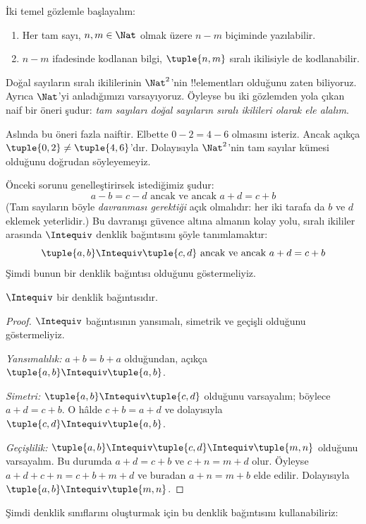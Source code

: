 \documentclass[../../../include/open-logic-section]{subfiles}
\begin{document}

İki temel gözlemle başlayalım:
	\begin{enumerate}
		\item Her tam sayı, $n, m \in\Nat$ olmak üzere $n - m$ biçiminde yazılabilir.
		\item $n - m$ ifadesinde kodlanan bilgi, $\tuple{n, m}$ sıralı ikilisiyle de kodlanabilir.
	\end{enumerate}
Doğal sayıların sıralı ikililerinin $\Nat^2$'nin !!{element}ları olduğunu
zaten biliyoruz. Ayrıca $\Nat$'yi anladığımızı varsayıyoruz. Öyleyse bu iki
gözlemden yola çıkan naif bir öneri şudur: \emph{tam sayıları doğal sayıların
sıralı ikilileri olarak ele alalım}.

Aslında bu öneri fazla naiftir. Elbette $0- 2 = 4 - 6$ olmasını isteriz.
Ancak açıkça $\tuple{0, 2 }\neq \tuple{4, 6}$'dır. Dolayısıyla $\Nat^2$'nin
tam sayılar kümesi olduğunu doğrudan söyleyemeyiz.

Önceki sorunu genelleştirirsek istediğimiz şudur:
	$$a - b = c - d \text{ ancak ve ancak }a + d = c + b$$
(Tam sayıların böyle \emph{davranması gerektiği} açık olmalıdır: her iki
tarafa da $b$ ve $d$ eklemek yeterlidir.) Bu davranışı güvence altına almanın
kolay yolu, sıralı ikililer arasında $\Intequiv$ denklik bağıntısını şöyle
tanımlamaktır:
$$\tuple{ a, b } \Intequiv \tuple{c, d}\text{ ancak ve ancak }a + d = c + b$$
Şimdi bunun bir denklik bağıntısı olduğunu göstermeliyiz.
\begin{prop} $\Intequiv$ bir denklik bağıntısıdır.
\end{prop}
	\begin{proof}
	$\Intequiv$ bağıntısının yansımalı, simetrik ve geçişli olduğunu göstermeliyiz.
	
	\emph{Yansımalılık:} $a + b = b + a$ olduğundan, açıkça
	$\tuple{a, b} \Intequiv \tuple{a, b}$.
	
	\emph{Simetri:} $\tuple{a, b} \Intequiv \tuple{c, d}$ olduğunu varsayalım;
	böylece $a + d = c + b$. O hâlde $c + b = a + d$ ve dolayısıyla
	$\tuple{c, d} \Intequiv \tuple{a, b}$.
	
	\emph{Geçişlilik:} $\tuple{a, b} \Intequiv \tuple{c, d}\Intequiv
	\tuple{m, n}$ olduğunu varsayalım. Bu durumda $a + d = c + b$ ve
	$c + n = m + d$ olur. Öyleyse $a + d + c + n = c + b + m + d$ ve
	buradan $a + n = m + b$ elde edilir. Dolayısıyla
	$\tuple{a, b } \Intequiv \tuple{m, n}$.
\end{proof}

Şimdi denklik sınıflarını oluşturmak için bu denklik bağıntısını kullanabiliriz:
\end{document}
